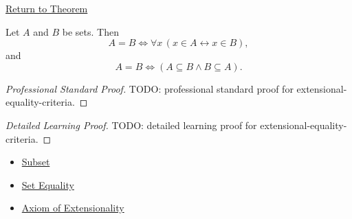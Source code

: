 \newpage
{}
\label{prf:extensional-equality-criteria}

\begin{remark*}[Return]
\hyperref[thm:extensional-equality-criteria]{Return to Theorem}
\end{remark*}

\begin{theorem*}
Let $A$ and $B$ be sets. Then
\[
A=B \iff \forall x\,(x\in A\leftrightarrow x\in B),
\]
and
\[
A=B \iff (A\subseteq B \land B\subseteq A).
\]
\end{theorem*}

\begin{proof}[Professional Standard Proof]
\LRAProofBodyStart
TODO: professional standard proof for extensional-equality-criteria.
\end{proof}

\begin{proof}[Detailed Learning Proof]
\LRAProofBodyStart
TODO: detailed learning proof for extensional-equality-criteria.
\end{proof}

\begin{remark*}
\end{remark*}

\begin{dependencies}
\begin{itemize}
  \item \hyperref[def:subset]{Subset}
  \item \hyperref[def:set-equality]{Set Equality}
  \item \hyperref[ax:extensionality]{Axiom of Extensionality}
\end{itemize}
\end{dependencies}

\clearpage
